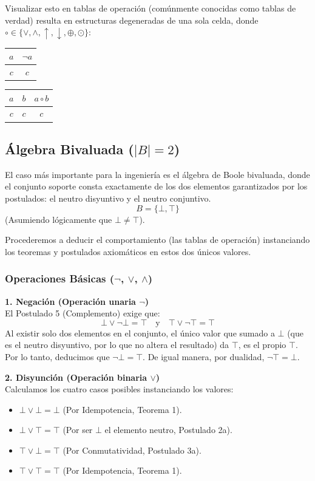 \documentclass[12pt,a4paper]{article}
\begin{document}
Visualizar esto en tablas de operación (comúnmente conocidas como tablas de verdad) resulta en estructuras degeneradas de una sola celda, donde $\circ \in \{ \vee, \wedge, \uparrow, \downarrow, \oplus, \odot \}$:

\begin{center}
\begin{tabular}{c|c}
$a$ & $\neg a$ \\
\hline
$c$ & $c$
\end{tabular}
\qquad
\begin{tabular}{cc|c}
$a$ & $b$ & $a \circ b$ \\
\hline
$c$ & $c$ & $c$
\end{tabular}
\end{center}

\subsection{Álgebra Bivaluada ($|B| = 2$)}
El caso más importante para la ingeniería es el álgebra de Boole bivaluada, donde el conjunto soporte consta exactamente de los dos elementos garantizados por los postulados: el neutro disyuntivo y el neutro conjuntivo. 
\[ B = \{ \bot, \top \} \]
(Asumiendo lógicamente que $\bot \neq \top$).

Procederemos a deducir el comportamiento (las tablas de operación) instanciando los teoremas y postulados axiomáticos en estos dos únicos valores.

\subsubsection{Operaciones Básicas ($\neg$, $\vee$, $\wedge$)}

\textbf{1. Negación (Operación unaria $\neg$)} \\
El Postulado 5 (Complemento) exige que:
\[ \bot \vee \neg \bot = \top \quad \text{y} \quad \top \vee \neg \top = \top \]
Al existir solo dos elementos en el conjunto, el único valor que sumado a $\bot$ (que es el neutro disyuntivo, por lo que no altera el resultado) da $\top$, es el propio $\top$. Por lo tanto, deducimos que $\neg \bot = \top$. De igual manera, por dualidad, $\neg \top = \bot$.

\textbf{2. Disyunción (Operación binaria $\vee$)} \\
Calculamos los cuatro casos posibles instanciando los valores:
\begin{itemize}
    \item $\bot \vee \bot = \bot$ (Por Idempotencia, Teorema 1).
    \item $\bot \vee \top = \top$ (Por ser $\bot$ el elemento neutro, Postulado 2a).
    \item $\top \vee \bot = \top$ (Por Conmutatividad, Postulado 3a).
    \item $\top \vee \top = \top$ (Por Idempotencia, Teorema 1).
\end{itemize}
\end{document}
